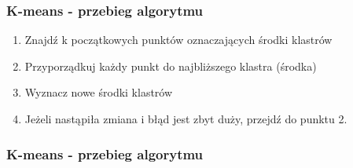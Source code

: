 \documentclass{beamer}
\begin{document}
\frame
{
	\frametitle{K-means - przebieg algorytmu}
	\begin{enumerate}
	\item{Znajdź k początkowych punktów oznaczających środki klastrów}
	\item{Przyporządkuj każdy punkt do najbliższego klastra (środka)}
	\item{Wyznacz nowe środki klastrów}
	\item{Jeżeli nastąpiła zmiana i błąd jest zbyt duży, przejdź do punktu 2.}
	\end{enumerate}
}

\frame
{
	\frametitle{K-means - przebieg algorytmu}
	\begin{figure}
	\centering
		 \hspace{0cm}
	 \hspace{0cm}
	\pause
		 \hspace{0cm}
	 \hspace{0cm}
	\end{figure}
}
\end{document}
